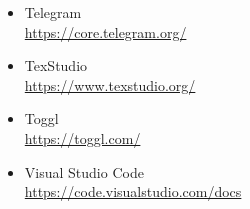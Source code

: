 \begin{itemize}
		\item Telegram \\\url{https://core.telegram.org/}
        \item TexStudio \\\url{https://www.texstudio.org/}
        \item Toggl \\\url{https://toggl.com/}
        \item Visual Studio Code \\\url{https://code.visualstudio.com/docs}
	\end{itemize}
